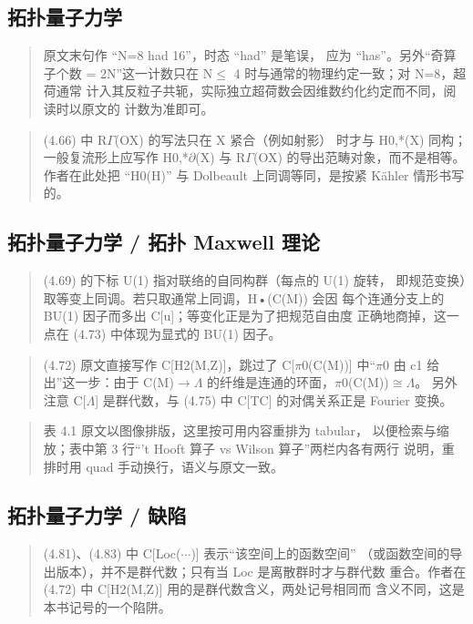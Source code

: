 \subsection*{拓扑量子力学}
\begin{quote}\small
原文末句作 “N=8 had 16”，时态 “had” 是笔误， 应为 “has”。另外“奇算子个数 = 2N”这一计数只在 N$\le$ 4 时与通常的物理约定一致；对 N=8，超荷通常 计入其反粒子共轭，实际独立超荷数会因维数约化约定而不同，阅读时以原文的 计数为准即可。
\end{quote}

\begin{quote}\small
(4.66) 中 R$\Gamma$(OX) 的写法只在 X 紧合（例如射影） 时才与 H0,*(X) 同构；一般复流形上应写作 H0,*$\partial$(X) 与 R$\Gamma$(OX) 的导出范畴对象，而不是相等。作者在此处把 “H0(H)” 与 Dolbeault 上同调等同，是按紧 Kähler 情形书写的。
\end{quote}

\subsection*{拓扑量子力学 / 拓扑 Maxwell 理论}
\begin{quote}\small
(4.69) 的下标 U(1) 指对联络的自同构群（每点的 U(1) 旋转， 即规范变换）取等变上同调。若只取通常上同调，H•(C(M)) 会因 每个连通分支上的 BU(1) 因子而多出 C[u]；等变化正是为了把规范自由度 正确地商掉，这一点在 (4.73) 中体现为显式的 BU(1) 因子。
\end{quote}

\begin{quote}\small
(4.72) 原文直接写作 C[H2(M,Z)]，跳过了 C[$\pi$0(C(M))] 中“$\pi$0 由 c1 给出”这一步：由于 C(M)$\to$$\Lambda$ 的纤维是连通的环面，$\pi$0(C(M))$\cong$$\Lambda$。 另外注意 C[$\Lambda$] 是群代数，与 (4.75) 中 C[TC] 的对偶关系正是 Fourier 变换。
\end{quote}

\begin{quote}\small
表 4.1 原文以图像排版，这里按可用内容重排为 tabular， 以便检索与缩放；表中第 3 行“'t Hooft 算子 vs Wilson 算子”两栏内各有两行 说明，重排时用 quad 手动换行，语义与原文一致。
\end{quote}

\subsection*{拓扑量子力学 / 缺陷}
\begin{quote}\small
(4.81)、(4.83) 中 C[Loc($\cdots$)] 表示“该空间上的函数空间” （或函数空间的导出版本），并不是群代数；只有当 Loc 是离散群时才与群代数 重合。作者在 (4.72) 中 C[H2(M,Z)] 用的是群代数含义，两处记号相同而 含义不同，这是本书记号的一个陷阱。
\end{quote}


